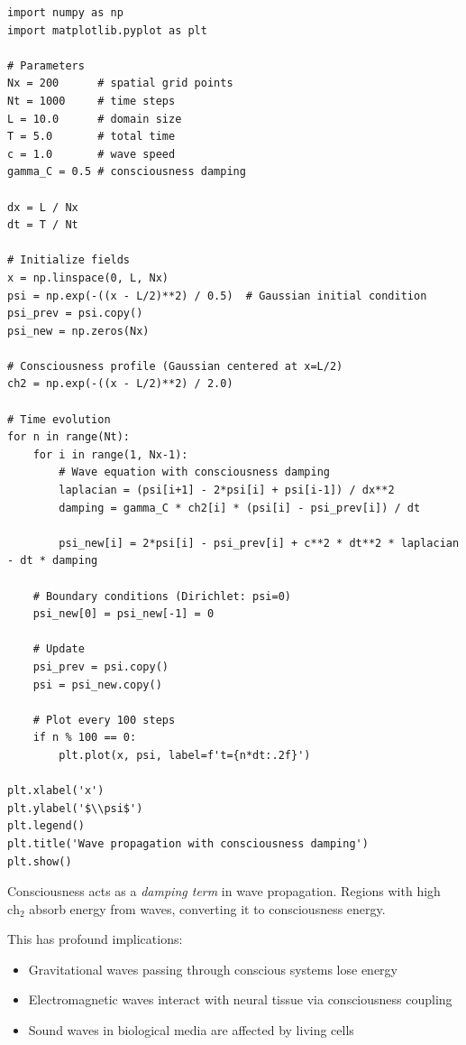\begin{lstlisting}[style=python, caption={Python code for 1D wave with consciousness}]
import numpy as np
import matplotlib.pyplot as plt

# Parameters
Nx = 200      # spatial grid points
Nt = 1000     # time steps
L = 10.0      # domain size
T = 5.0       # total time
c = 1.0       # wave speed
gamma_C = 0.5 # consciousness damping

dx = L / Nx
dt = T / Nt

# Initialize fields
x = np.linspace(0, L, Nx)
psi = np.exp(-((x - L/2)**2) / 0.5)  # Gaussian initial condition
psi_prev = psi.copy()
psi_new = np.zeros(Nx)

# Consciousness profile (Gaussian centered at x=L/2)
ch2 = np.exp(-((x - L/2)**2) / 2.0)

# Time evolution
for n in range(Nt):
    for i in range(1, Nx-1):
        # Wave equation with consciousness damping
        laplacian = (psi[i+1] - 2*psi[i] + psi[i-1]) / dx**2
        damping = gamma_C * ch2[i] * (psi[i] - psi_prev[i]) / dt

        psi_new[i] = 2*psi[i] - psi_prev[i] + c**2 * dt**2 * laplacian - dt * damping

    # Boundary conditions (Dirichlet: psi=0)
    psi_new[0] = psi_new[-1] = 0

    # Update
    psi_prev = psi.copy()
    psi = psi_new.copy()

    # Plot every 100 steps
    if n % 100 == 0:
        plt.plot(x, psi, label=f't={n*dt:.2f}')

plt.xlabel('x')
plt.ylabel('$\\psi$')
plt.legend()
plt.title('Wave propagation with consciousness damping')
plt.show()
\end{lstlisting}

\begin{keyidea}
Consciousness acts as a \textit{damping term} in wave propagation. Regions with high $\text{ch}_2$ absorb energy from waves, converting it to consciousness energy.

This has profound implications:
\begin{itemize}
\item Gravitational waves passing through conscious systems lose energy
\item Electromagnetic waves interact with neural tissue via consciousness coupling
\item Sound waves in biological media are affected by living cells
\end{itemize}
\end{keyidea}

